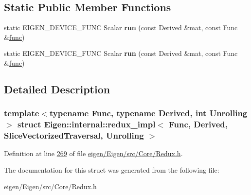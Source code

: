 \subsection*{Static Public Member Functions}
\begin{DoxyCompactItemize}
\item 
\mbox{\label{struct_eigen_1_1internal_1_1redux__impl_3_01_func_00_01_derived_00_01_slice_vectorized_traversal_00_01_unrolling_01_4_a1bd17f4693bd0df8c669a65990aaa248}} 
static E\+I\+G\+E\+N\+\_\+\+D\+E\+V\+I\+C\+E\+\_\+\+F\+U\+NC Scalar {\bfseries run} (const Derived \&mat, const Func \&\hyperlink{structfunc}{func})
\item 
\mbox{\label{struct_eigen_1_1internal_1_1redux__impl_3_01_func_00_01_derived_00_01_slice_vectorized_traversal_00_01_unrolling_01_4_a1bd17f4693bd0df8c669a65990aaa248}} 
static E\+I\+G\+E\+N\+\_\+\+D\+E\+V\+I\+C\+E\+\_\+\+F\+U\+NC Scalar {\bfseries run} (const Derived \&mat, const Func \&\hyperlink{structfunc}{func})
\end{DoxyCompactItemize}


\subsection{Detailed Description}
\subsubsection*{template$<$typename Func, typename Derived, int Unrolling$>$\newline
struct Eigen\+::internal\+::redux\+\_\+impl$<$ Func, Derived, Slice\+Vectorized\+Traversal, Unrolling $>$}



Definition at line \hyperlink{eigen_2_eigen_2src_2_core_2_redux_8h_source_l00269}{269} of file \hyperlink{eigen_2_eigen_2src_2_core_2_redux_8h_source}{eigen/\+Eigen/src/\+Core/\+Redux.\+h}.



The documentation for this struct was generated from the following file\+:\begin{DoxyCompactItemize}
\item 
eigen/\+Eigen/src/\+Core/\+Redux.\+h\end{DoxyCompactItemize}
